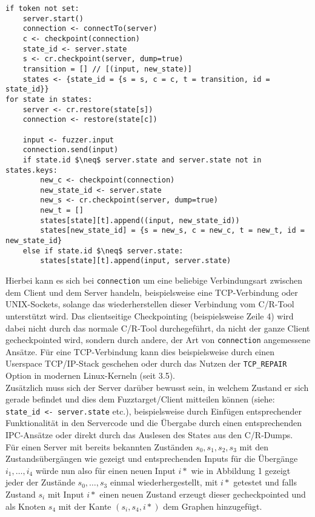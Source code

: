 \documentclass[a4paper]{article}
\begin{document}
\begin{lstlisting}[mathescape, caption=Fuzztarget zur Exploration des Zustandsgraphen]
if token not set:
    server.start()
    connection <- connectTo(server)
    c <- checkpoint(connection)
    state_id <- server.state
    s <- cr.checkpoint(server, dump=true)
    transition = [] // [(input, new_state)]
    states <- {state_id = {s = s, c = c, t = transition, id = state_id}}
for state in states:
    server <- cr.restore(state[s])
    connection <- restore(state[c])

    input <- fuzzer.input
    connection.send(input)
    if state.id $\neq$ server.state and server.state not in states.keys:
        new_c <- checkpoint(connection)
        new_state_id <- server.state
        new_s <- cr.checkpoint(server, dump=true)
        new_t = []
        states[state][t].append((input, new_state_id))
        states[new_state_id] = {s = new_s, c = new_c, t = new_t, id = new_state_id}
    else if state.id $\neq$ server.state:
        states[state][t].append(input, server.state)
\end{lstlisting}
Hierbei kann es sich bei \texttt{connection} um eine beliebige Verbindungsart zwischen dem Client und dem Server handeln, beispielsweise eine TCP-Verbindung oder UNIX-Sockets, solange das wiederherstellen dieser Verbindung vom C/R-Tool unterstützt wird. Das clientseitige Checkpointing (beispielsweise Zeile 4) wird dabei nicht durch das normale C/R-Tool durchegeführt, da nicht der ganze Client gecheckpointed wird, sondern durch andere, der Art von \texttt{connection} angemessene Ansätze. Für eine TCP-Verbindung kann dies beispielsweise durch einen Userspace TCP/IP-Stack geschehen oder durch das Nutzen der \texttt{TCP\_REPAIR} Option in modernen Linux-Kerneln (seit 3.5).\\
Zusätzlich muss sich der Server darüber bewusst sein, in welchem Zustand er sich gerade befindet und dies dem Fuzztarget/Client mitteilen können (siehe: \texttt{state\_id <- server.state} etc.), beispielsweise durch Einfügen entsprechender Funktionalität in den Servercode und die Übergabe durch einen entsprechenden IPC-Ansätze oder direkt durch das Auslesen des States aus den C/R-Dumps.\\
Für einen Server mit bereits bekannten Zuständen $s_0, s_1, s_2, s_3$ mit den Zustandsübergängen wie gezeigt und entsprechenden Inputs für die Übergänge $i_1, \dots, i_4$ würde nun also für einen neuen Input $i*$ wie in Abbildung 1 gezeigt jeder der Zustände $s_0, \dots, s_3$ einmal wiederhergestellt, mit $i*$ getestet und falls Zustand $s_i$ mit Input $i*$ einen neuen Zustand erzeugt dieser gecheckpointed und als Knoten $s_4$ mit der Kante $(s_i, s_4, i*)$ dem Graphen hinzugefügt.
\end{document}
